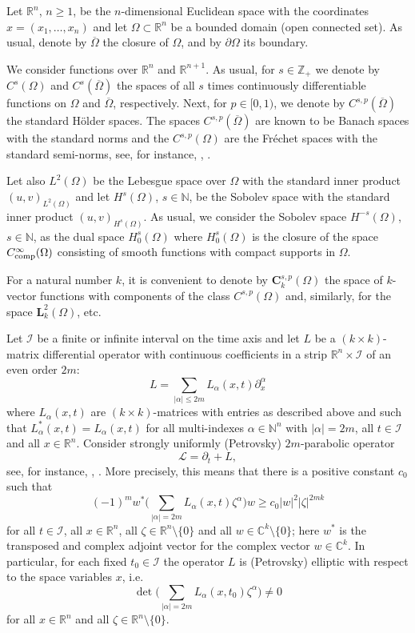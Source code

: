 \documentclass{amsart}
\theoremstyle{definition}
\theoremstyle{remark}
\numberwithin{equation}{section}
\begin{document}
Let ${\mathbb R}^n$, $n \geq 1$, be the $n$-dimensional Euclidean space with the coordinates  
$x=(x_1, \dots , x_n)$ and let  $\Omega \subset {\mathbb R}^n$ be a bounded domain 
(open connected set). As usual, denote by  $\overline{\Omega}$ the closure of $\Omega$, and by
 $\partial\Omega$ its boundary.  
 
We consider functions over  ${\mathbb R}^n$ and 
${\mathbb R}^{n+1}$.  As usual, for $s \in {\mathbb Z}_+$ we denote by $C^s(\Omega)$ 
and $C^s(\overline \Omega)$  the spaces of all $s$ times continuously differentiable 
functions on $\Omega$ and $\overline \Omega$, respectively.  Next,  for  $p\in [0,1)$, 
we denote by $C^{s,p}(\overline \Omega)$ the standard H\"older spaces. 
The spaces $C^{s,p}(\overline \Omega)$ are known to be Banach spaces with the standard  
norms and the  $C^{s,p}(\Omega)$ are the Fr\'echet spaces with the standard semi-norms, see, 
for instance, \cite{Kry96}, \cite{LadSoUr67}.

Let  also $L^2 (\Omega)$ be the Lebesgue space over $\Omega$ with the standard inner product 
$(u,v)_{L^2 (\Omega)} $ and let $H^s (\Omega)$, $s\in \mathbb N$, be the Sobolev space  
with the standard inner product $(u,v)_{H^s (\Omega)}$. As usual, we 
consider the Sobolev space $H^{-s} (\Omega)$, $s\in \mathbb N$, as the dual space 
$H^{s}_0 (\Omega)$ where $H^{s}_0 (\Omega)$ is the closure of the space 
$C^\infty_{\rm comp} (\Omega)$ consisting of smooth 
functions with compact supports in $\Omega$.  

For a natural number $k$, it is convenient to denote by ${\mathbf C} ^{s,p} _k (\Omega)$ 
the space of $k$-vector functions with components of the class $C ^{s,p} (\Omega)$ and, 
similarly, for the space $\mathbf{L}^2_k (\Omega)$, etc. 

Let $\mathcal{I}$ be a finite or infinite interval on the time axis and let  $L$ be a 
$(k\times k)$-matrix differential operator 
with continuous coefficients in a strip ${\mathbb R}^{n} \times \mathcal{I}$ of an even order 
$2m$:
$$
L = \sum_{|\alpha|\leq 2m} L_{\alpha} (x,t) \partial ^\alpha_x 
$$ 
where $L_{\alpha} (x,t)$ are $(k\times k)$-matrices with entries as described above and 
such that $L^*_\alpha (x,t)= L_\alpha (x,t)$ for all multi-indexes $\alpha \in {\mathbb N}^n$ 
with $|\alpha|=2m$, all $t\in \mathcal{I}$   and all $x \in {\mathbb R}^n$. Consider  strongly 
uniformly (Petrovsky) $2m$-parabolic operator  
$$
{\mathcal L}= \partial _t + L,
$$  
see, for instance, \cite{eid}, \cite{sol}. More precisely, this means that 
there is a positive constant $c_0$ such that 
$$
(-1)^{m} w^* \Big(
\sum_{|\alpha| =2m}L_\alpha (x,t)\zeta ^\alpha \Big) w \geq c_0 |w|^2 |\zeta|^{2mk}
$$
for all $t\in \mathcal{I}$, all $x \in {\mathbb R}^n$, all $\zeta \in {\mathbb R}^n \setminus 
\{0\}$ and all $w \in {\mathbb C}^k \setminus \{0\}$; here $w^*$ is the transposed and complex 
adjoint vector for the complex vector $w \in {\mathbb C}^k$. In particular, for each fixed 
$t_0\in \mathcal{I}$ the operator $L$ is (Petrovsky) elliptic with respect to the space 
variables $x$, i.e. 
$$
\det \Big(\sum_{|\alpha| =2m}L_\alpha (x,t_0)\zeta ^\alpha \Big) \ne 0
$$
for all $x \in {\mathbb R}^n$ and all $\zeta \in {\mathbb R}^n \setminus \{0\}$. 
\end{document}
